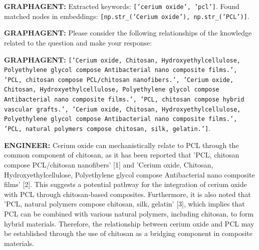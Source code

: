 \documentclass{article}
\begin{document}
\begin{leftbubbles}
\textbf{GRAPHAGENT:} Extracted keywords: \texttt{['cerium oxide', 'pcl']}. 
Found matched nodes in embeddings: \texttt{[np.str\_('Cerium oxide'), np.str\_('PCL')]}.

\textbf{GRAPHAGENT:} Please consider the following relationships of the knowledge related to the question and make your response: 

\textbf{GRAPHAGENT:} \texttt{['Cerium oxide, Chitosan, Hydroxyethylcellulose, Polyethylene glycol compose Antibacterial nano composite films.', 'PCL, chitosan compose PCL/chitosan nanofibers.', 'Cerium oxide, Chitosan, Hydroxyethylcellulose, Polyethylene glycol compose Antibacterial nano composite films.', 'PCL, chitosan compose hybrid vascular grafts.', 'Cerium oxide, Chitosan, Hydroxyethylcellulose, Polyethylene glycol compose Antibacterial nano composite films.', 'PCL, natural polymers compose chitosan, silk, gelatin.']}.
\end{leftbubbles}

\begin{rightbubbles}
\textbf{ENGINEER:} Cerium oxide can mechanistically relate to PCL through the common component of chitosan, as it has been reported that 'PCL, chitosan compose PCL/chitosan nanofibers' [1] and 'Cerium oxide, Chitosan, Hydroxyethylcellulose, Polyethylene glycol compose Antibacterial nano composite films' [2]. This suggests a potential pathway for the integration of cerium oxide with PCL through chitosan-based composites. Furthermore, it is also noted that 'PCL, natural polymers compose chitosan, silk, gelatin' [3], which implies that PCL can be combined with various natural polymers, including chitosan, to form hybrid materials. Therefore, the relationship between cerium oxide and PCL may be established through the use of chitosan as a bridging component in composite materials.
\end{rightbubbles}
\end{document}
